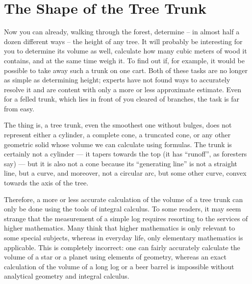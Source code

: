 \section{The Shape of the Tree Trunk}
\label{sec-1.10}

Now you can already, walking through the forest, determine -- in almost half a dozen different ways -- the height of any tree. It will probably be interesting for you to determine its volume as well, calculate how many cubic meters of wood it contains, and at the same time weigh it. To find out if, for example, it would be possible to take away such a trunk on one cart. Both of these tasks are no longer as simple as determining height; experts have not found ways to accurately resolve it and are content with only a more or less approximate estimate. Even for a felled trunk, which lies in front of you cleared of branches, the task is far from easy.

The thing is, a tree trunk, even the smoothest one without bulges, does not represent either a cylinder, a complete cone, a truncated cone, or any other geometric solid whose volume we can calculate using formulas. The trunk is certainly not a cylinder — it tapers towards the top (it has ``runoff'', as foresters say) — but it is also not a cone because its ``generating line'' is not a straight line, but a curve, and moreover, not a circular arc, but some other curve, convex towards the axis of the tree.

Therefore, a more or less accurate calculation of the volume of a tree trunk can only be done using the tools of integral calculus. To some readers, it may seem strange that the measurement of a simple log requires resorting to the services of higher mathematics. Many think that higher mathematics is only relevant to some special subjects, whereas in everyday life, only elementary mathematics is applicable. This is completely incorrect: one can fairly accurately calculate the volume of a star or a planet using elements of geometry, whereas an exact calculation of the volume of a long log or a beer barrel is impossible without analytical geometry and integral calculus.

